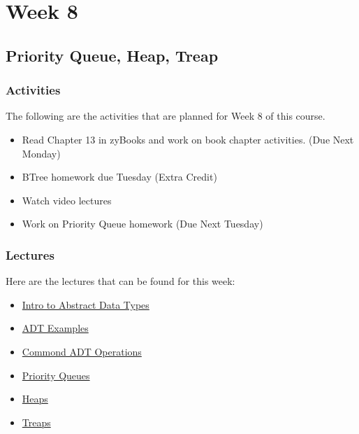 \clearpage

\chapter{Week 8}

\section{Priority Queue, Heap, Treap}

\horizontalline

\subsection{Activities}

The following are the activities that are planned for Week 8 of this course.

\begin{itemize}
    \item Read Chapter 13 in zyBooks and work on book chapter activities. (Due Next Monday)
    \item BTree homework due Tuesday (Extra Credit)
    \item Watch video lectures
    \item Work on Priority Queue homework (Due Next Tuesday)
\end{itemize}

\subsection{Lectures}

Here are the lectures that can be found for this week:

\begin{itemize}
    \item \href{https://applied.cs.colorado.edu/mod/hvp/view.php?id=45994}{Intro to Abstract Data Types}
    \item \href{https://applied.cs.colorado.edu/mod/hvp/view.php?id=45995}{ADT Examples}
    \item \href{https://applied.cs.colorado.edu/mod/hvp/view.php?id=45996}{Commond ADT Operations}
    \item \href{https://applied.cs.colorado.edu/mod/hvp/view.php?id=45997}{Priority Queues}
    \item \href{https://applied.cs.colorado.edu/mod/hvp/view.php?id=45998}{Heaps}
    \item \href{https://applied.cs.colorado.edu/mod/hvp/view.php?id=45999}{Treaps}
\end{itemize}

